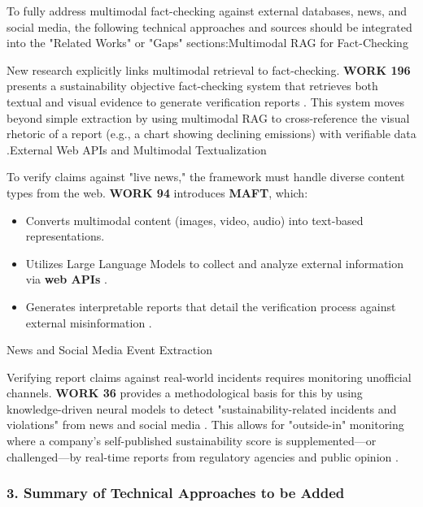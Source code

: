 \documentclass{article}
\begin{document}
To fully address multimodal fact-checking against external databases, news, and social media, the following technical approaches and sources should be integrated into the "Related Works" or "Gaps" sections:Multimodal RAG for Fact-Checking

New research explicitly links multimodal retrieval to fact-checking. \textbf{WORK 196} presents a sustainability objective fact-checking system that retrieves both textual and visual evidence to generate verification reports  \parencite{mohammad_mahdavi_619c09a8}. This system moves beyond simple extraction by using multimodal RAG to cross-reference the visual rhetoric of a report (e.g., a chart showing declining emissions) with verifiable data  \parencite{mohammad_mahdavi_619c09a8}.External Web APIs and Multimodal Textualization

To verify claims against "live news," the framework must handle diverse content types from the web. \textbf{WORK 94} introduces \textbf{MAFT}, which:
\begin{itemize}
\item 

Converts multimodal content (images, video, audio) into text-based representations.\item 

Utilizes Large Language Models to collect and analyze external information via \textbf{web APIs}  \parencite{kazuya_kakizaki_4193ad80}.\item 

Generates interpretable reports that detail the verification process against external misinformation  \parencite{kazuya_kakizaki_4193ad80}.
\end{itemize}News and Social Media Event Extraction

Verifying report claims against real-world incidents requires monitoring unofficial channels. \textbf{WORK 36} provides a methodological basis for this by using knowledge-driven neural models to detect "sustainability-related incidents and violations" from news and social media  \parencite{abir_naskar_17efeb7b}. This allows for "outside-in" monitoring where a company’s self-published sustainability score is supplemented—or challenged—by real-time reports from regulatory agencies and public opinion  \parencite{abir_naskar_17efeb7b}.
\subsubsection{3. Summary of Technical Approaches to be Added}
\end{document}
